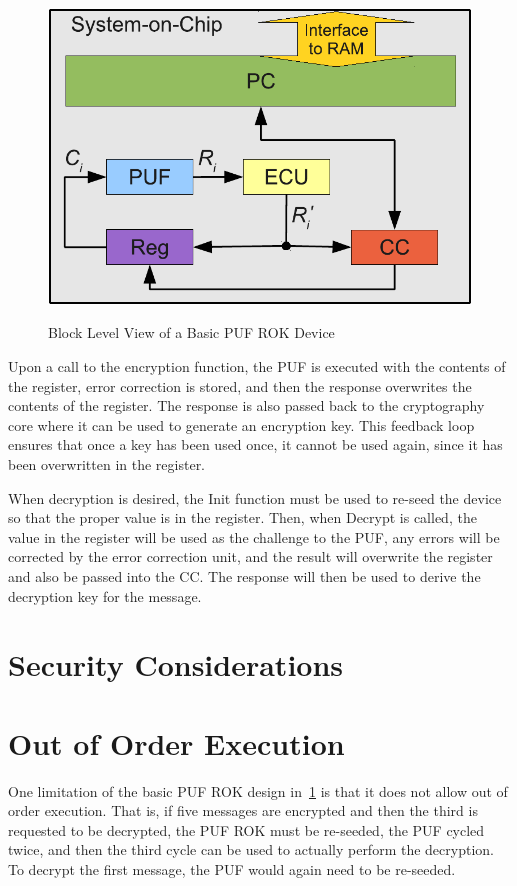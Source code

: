 \begin{figure}[!ht]
\includegraphics[width=500px]{images/rok_soc.pdf}
\label{fig:basicrok}
\caption{Block Level View of a Basic PUF ROK Device}
\end{figure}
\FloatBarrier

Upon a call to the encryption function, the PUF is executed with the contents of the register, error correction is stored,
and then the response overwrites the contents of the register. The response is also passed back to the cryptography
core where it can be used to generate an encryption key. This feedback loop ensures that once a key has been used
once, it cannot be used again, since it has been overwritten in the register.

When decryption is desired, the Init function must be used to re-seed the device so that the proper value is in the
register. Then, when Decrypt is called, the value in the register will be used as the challenge to the PUF, any errors
will be corrected by the error correction unit, and the result will overwrite the register and also be passed into the
CC. The response will then be used to derive the decryption key for the message.

\section{Security Considerations}

\section{Out of Order Execution}
One limitation of the basic PUF ROK design in~\ref{fig:basicrok} is that it does not allow out of order execution. That is,
if five messages are encrypted and then the third is requested to be decrypted, the PUF ROK must be re-seeded, the PUF
cycled twice, and then the third cycle can be used to actually perform the decryption. To decrypt the first message, the
PUF would again need to be re-seeded. 


